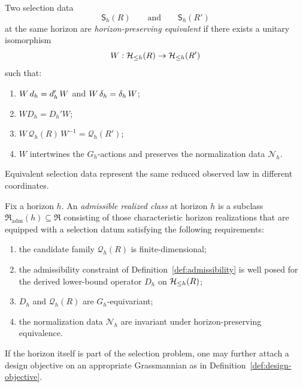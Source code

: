 \begin{definition}
\label{def:horizon-preserving-equivalence}
Two selection data
\[
\mathsf S_h(R)
\qquad\text{and}\qquad
\mathsf S_h(R')
\]
at the same horizon are \emph{horizon-preserving equivalent} if there exists a
unitary isomorphism
\[
W:\CCHobs{h}(R)\to \CCHobs{h}(R')
\]
such that:
\begin{enumerate}[label=(\roman*), leftmargin=2em, itemsep=0.2em]
\item $W\,\CCObs{d}{h} = \CCObs{d'}{h}\,W$ and
      $W\,\CCDefect{d}{h} = \CCDefect{d'}{h}\,W$;
\item $W D_h = D_h' W$;
\item $W\,\mathcal Q_h(R)\,W^{-1} = \mathcal Q_h(R')$;
\item $W$ intertwines the $G_h$-actions and preserves the normalization data
      $\mathcal N_h$.
\end{enumerate}
Equivalent selection data represent the same reduced observed law in different
coordinates.
\end{definition}

\begin{definition}
\label{def:admissible-realized-class}
Fix a horizon $h$. An \emph{admissible realized class} at horizon $h$ is a
subclass $\mathfrak R_{\mathrm{adm}}(h)\subseteq \mathfrak R$ consisting of
those characteristic horizon realizations that are equipped with a selection
datum satisfying the following requirements:
\begin{enumerate}[label=(\roman*), leftmargin=2em, itemsep=0.2em]
\item the candidate family $\mathcal Q_h(R)$ is finite-dimensional;
\item the admissibility constraint of
      Definition~\ref{def:admissibility} is well posed for the derived
      lower-bound operator $D_h$ on $\CCHobs{h}(R)$;
\item $D_h$ and $\mathcal Q_h(R)$ are $G_h$-equivariant;
\item the normalization data $\mathcal N_h$ are invariant under
      horizon-preserving equivalence.
\end{enumerate}
If the horizon itself is part of the selection problem, one may further attach
a design objective on an appropriate Grassmannian as in
Definition~\ref{def:design-objective}.
\end{definition}

